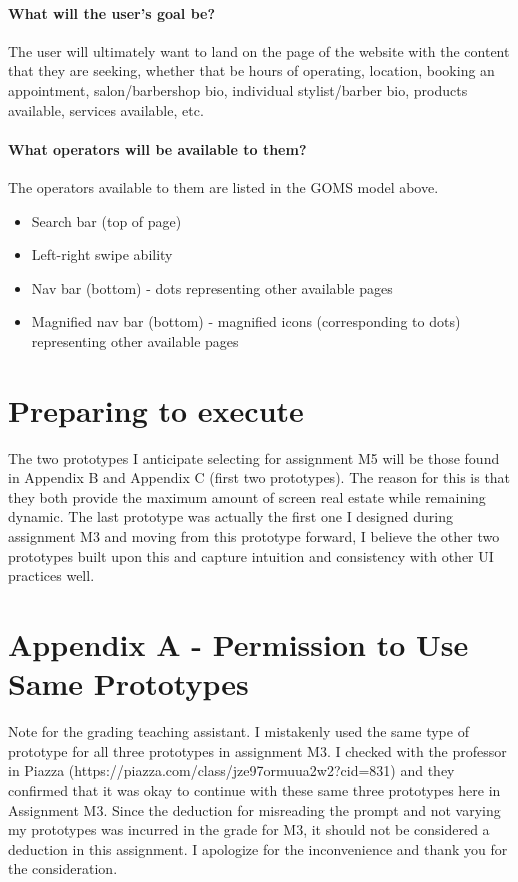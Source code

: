 \paragraph{What will the user’s goal be?} The user will ultimately want to land on the page of the website with the content that they are seeking, whether that be hours of operating, location, booking an appointment, salon/barbershop bio, individual stylist/barber bio, products available, services available, etc.

\paragraph{What operators will be available to them?} The operators available to them are listed in the GOMS model above.

\begin{itemize}
\item
  Search bar (top of page)
\item
  Left-right swipe ability
\item
  Nav bar (bottom) - dots representing other available pages
\item
  Magnified nav bar (bottom) - magnified icons (corresponding to dots) representing other available pages
\end{itemize}

\section{Preparing to execute}
The two prototypes I anticipate selecting for assignment M5 will be those found in Appendix B and Appendix C (first two prototypes). The reason for this is that they both provide the maximum amount of screen real estate while remaining dynamic. The last prototype was actually the first one I designed during assignment M3 and moving from this prototype forward, I believe the other two prototypes built upon this and capture intuition and consistency with other UI practices well.

\clearpage

\section{Appendix A - Permission to Use Same Prototypes}

Note for the grading teaching assistant. I mistakenly used the same type of prototype for all three prototypes in assignment M3. I checked with the professor in Piazza (https://piazza.com/class/jze97ormuua2w2?cid=831) and they confirmed that it was okay to continue with these same three prototypes here in Assignment M3. Since the deduction for misreading the prompt and not varying my prototypes was incurred in the grade for M3, it should not be considered a deduction in this assignment. I apologize for the inconvenience and thank you for the consideration.

